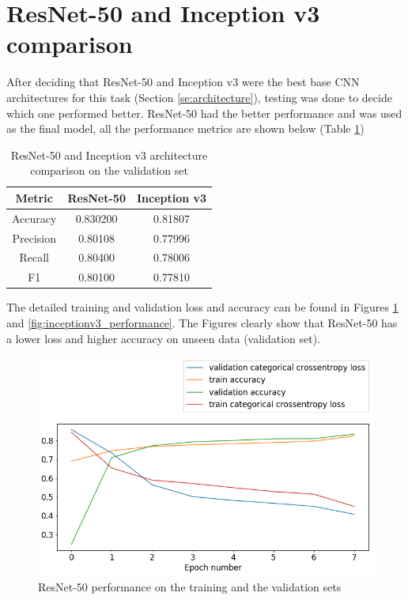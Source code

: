 \documentclass[times, utf8, diplomski]{fer}
\begin{document}
\section{ResNet-50 and Inception v3 comparison}
\label{se:resnet_vs_inception}

After deciding that ResNet-50 and Inception v3 were the best base CNN architectures for this task (Section \ref{se:architecture}), testing was done to decide which one performed better. ResNet-50 had the better performance and was used as the final model, all the performance metrics are shown below (Table \ref{tb:resnet_vs_inceptionv3})

\begin{table}
\centering
\caption{ResNet-50 and Inception v3 architecture comparison on the validation set}
\label{tb:resnet_vs_inceptionv3}
\begin{tabular}{ccc}
\hline 
Metric & ResNet-50 & Inception v3 \\ \hline 
Accuracy & 0.830200 & 0.81807 \\ 
Precision & 0.80108 & 0.77996 \\ 
Recall & 0.80400 & 0.78006 \\
F1 & 0.80100 &  0.77810 \\
\hline 
\end{tabular} 
\end{table}

The detailed training and validation loss and accuracy can be found in Figures \ref{fig:resnet_performance} and \ref{fig:inceptionv3_performance}. The Figures clearly show that ResNet-50 has a lower loss and higher accuracy on unseen data (validation set).

\begin{figure}
  \includegraphics[scale=0.61]{figures/resnet_performance.png}
  \centering
  \caption{ResNet-50 performance on the training and the validation sets}
  \label{fig:resnet_performance}
\end{figure}
\end{document}
